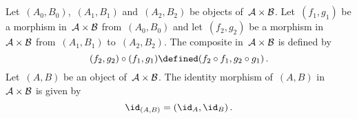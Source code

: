 \subsection{}

Let~$(A_0, B_0)$,~$(A_1, B_1)$ and~$(A_2, B_2)$ be objects of~$\mathcal{A} \times \mathcal{B}$.
Let~$(f_1, g_1)$ be a morphism in~$\mathcal{A} \times \mathcal{B}$ from~$(A_0, B_0)$ and let~$(f_2, g_2)$ be a morphism in~$\mathcal{A} \times \mathcal{B}$ from~$(A_1, B_1)$ to~$(A_2, B_2)$.
The composite in~$\mathcal{A} \times \mathcal{B}$ is defined by
\[
	(f_2, g_2) \circ (f_1, g_1)
	\defined
	(f_2 \circ f_1, g_2 \circ g_1) \,.
\]
Let~$(A, B)$ be an object of~$\mathcal{A} \times \mathcal{B}$.
The identity morphism of~$(A, B)$ in~$\mathcal{A} \times \mathcal{B}$ is given by
\[
	\id_{(A, B)}
	=
	(\id_A, \id_B) \,.
\]

